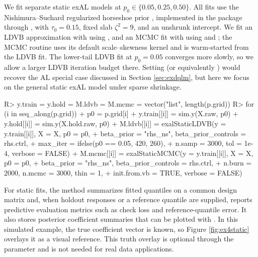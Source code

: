 \documentclass{jss}
\begin{document}
We fit separate static exAL models at \(p_0 \in \{0.05,0.25,0.50\}\). All fits use the Nishimura--Suchard regularized horseshoe prior \citep{nishimura2023shrunken}, implemented in the package through , with \(\tau_0 = 0.15\), fixed slab \(\zeta^2 = 9\), and an unshrunk intercept. We fit an LDVB approximation with  using , and an MCMC fit with  using  and ; the MCMC routine uses its default  scale--skewness kernel and is warm-started from the LDVB fit. The lower-tail LDVB fit at \(p_0 = 0.05\) converges more slowly, so we allow a larger LDVB iteration budget there. Setting  (or equivalently ) would recover the AL special case discussed in Section \ref{sec:exdqlm}, but here we focus on the general static exAL model under sparse  shrinkage.

\begin{CodeChunk}
\begin{CodeInput}
R> y.train = y.hold = M.ldvb = M.mcmc = vector("list", length(p.grid))
R> for (i in seq_along(p.grid)) {
+     p0 = p.grid[i]
+     y.train[[i]] = sim.y(X.raw, p0)
+     y.hold[[i]] = sim.y(X.hold.raw, p0)
+     M.ldvb[[i]] = exalStaticLDVB(y = y.train[[i]], X = X, p0 = p0,
+                    beta_prior = "rhs_ns", beta_prior_controls = rhs.ctrl,
+                    max_iter = ifelse(p0 == 0.05, 420, 260),
+                    n.samp = 3000, tol = 1e-4, verbose = FALSE)
+     M.mcmc[[i]] = exalStaticMCMC(y = y.train[[i]], X = X, p0 = p0,
+                    beta_prior = "rhs_ns", beta_prior_controls = rhs.ctrl,
+                    n.burn = 2000, n.mcmc = 3000, thin = 1,
+                    init.from.vb = TRUE, verbose = FALSE)}
\end{CodeInput}
\end{CodeChunk}

For static fits, the  method summarizes fitted quantiles on a common design matrix and, when holdout responses or a reference quantile are supplied, reports predictive evaluation metrics such as check loss and reference-quantile error. It also stores posterior coefficient summaries that can be plotted with . In this simulated example, the true coefficient vector is known, so Figure \ref{fig:ex4static} overlays it as a visual reference. This truth overlay is optional through the parameter  and is not needed for real data applications.
\end{document}
